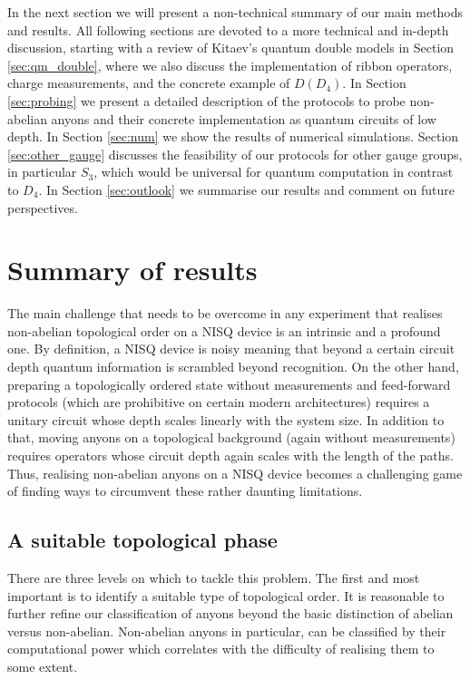 \documentclass[a4paper,twocolumn,11pt, accepted=2024-06-14]{quantumarticle}
\begin{document}
In the next section we will present a non-technical summary of our main methods and results. All following sections are devoted to a more technical and in-depth discussion, starting with a review of Kitaev's quantum double models in Section \ref{sec:qm_double}, where we also discuss the implementation of ribbon operators, charge measurements, and the concrete example of $D(D_4)$. In Section \ref{sec:probing} we present a detailed description of the protocols to probe non-abelian anyons and their concrete implementation as quantum circuits of low depth. In Section \ref{sec:num} we show the results of numerical simulations. Section \ref{sec:other_gauge} discusses the feasibility of our protocols for other gauge groups, in particular $S_3$, which would be universal for quantum computation in contrast to $D_4$. In Section \ref{sec:outlook} we summarise our results and comment on future perspectives.

\section{Summary of results}\label{sec:summary_intro}
The main challenge that needs to be overcome in any experiment that realises non-abelian topological order on a NISQ device is an intrinsic and a profound one. By definition, a NISQ device is noisy meaning that beyond a certain circuit depth quantum information is scrambled beyond recognition. On the other hand, preparing a topologically ordered state without measurements and feed-forward protocols (which are prohibitive on certain modern architectures) requires a unitary circuit whose depth scales linearly with the system size. In addition to that, moving anyons on a topological background (again without measurements) requires operators whose circuit depth again scales with the length of the paths. Thus, realising non-abelian anyons on a NISQ device becomes a challenging game of finding ways to circumvent these rather daunting limitations. 

\subsection{A suitable topological phase}

There are three levels on which to tackle this problem. The first and most important is to identify a suitable type of topological order. It is reasonable to further refine our classification of anyons beyond the basic distinction of abelian versus non-abelian. Non-abelian anyons in particular, can be classified by their computational power which correlates with the difficulty of realising them to some extent. 
\end{document}
